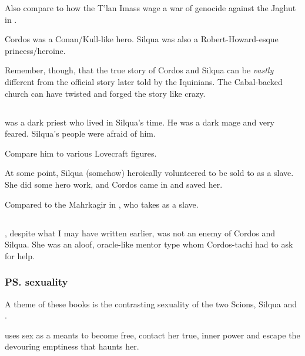 Also compare to how the T'lan Imass wage a war of genocide against the Jaghut in \cite{StevenEriksonIanCameronEsslemont:MalazanBookoftheFallen}. 

Cordos was a Conan/Kull-like hero. 
Silqua was also a Robert-Howard-esque princess/heroine. 

Remember, though, that the true story of Cordos and Silqua can be \emph{vastly} different from the official story later told by the Iquinians. 
The Cabal-backed church can have twisted and forged the story like crazy. 









\subsection[Byakun]{\Byakun}
\Byakun was a dark priest who lived in Silqua's time. 
He was a dark mage and very feared. 
Silqua's people were afraid of him. 

Compare him to various Lovecraft figures. 

At some point, Silqua (somehow) heroically volunteered to be sold to \Byakun as a slave. 
She did some hero work, and Cordos came in and saved her. 

Compared to the Mahrkagir in \cite{JacquelineCarey:KushielsAvatar}, who takes \Phedre as a slave. 










\subsection{\Delphine}
\Delphine, despite what I may have written earlier, was not an enemy of Cordos and Silqua. 
She was an aloof, oracle-like mentor type whom Cordos-tachi had to ask for help. 






\subsubsection{\ps{\Delphine}{} sexuality}
A theme of these books is the contrasting sexuality of the two Scions, Silqua and \Delphine{}. 

\Delphine{} uses sex as a meants to become free, contact her true, inner power and escape the devouring emptiness that haunts her. 

